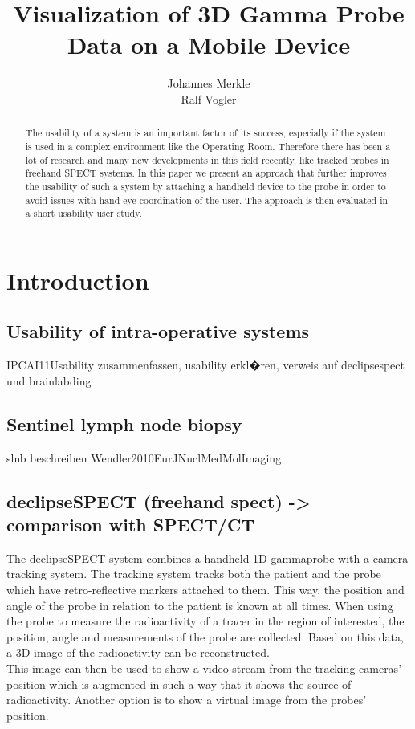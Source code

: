 \documentclass{scrartcl}
\title{Visualization of 3D Gamma Probe Data on a Mobile Device}
\author{Johannes Merkle \\ Ralf Vogler}
\begin{document}
\maketitle

\begin{abstract}
The usability of a system is an important factor of its success, especially if the system is used in a complex environment like the Operating Room. Therefore there has been a lot of research and many new developments in this field recently, like tracked probes in freehand SPECT systems. In this paper we present an approach that further improves the usability of such a system by attaching a handheld device to the probe in order to avoid issues with hand-eye coordination of the user. The approach is then evaluated in a short usability user study.
\end{abstract}


\section{Introduction}

\subsection{Usability of intra-operative systems}
IPCAI11Usability zusammenfassen, usability erkl�ren, verweis auf declipsespect und brainlabding

\subsection{Sentinel lymph node biopsy}
slnb beschreiben Wendler2010EurJNuclMedMolImaging

\subsection{declipseSPECT (freehand spect) -> comparison with SPECT/CT}
The declipseSPECT system combines a handheld 1D-gammaprobe with a camera tracking system. The tracking system tracks both the patient and the probe which have retro-reflective markers attached to them. This way, the position and angle of the probe in relation to the patient is known at all times. When using the probe to measure the radioactivity of a tracer in the region of interested, the position, angle and measurements of the probe are collected. Based on this data, a 3D image of the radioactivity can be reconstructed.\\
This image can then be used to show a video stream from the tracking cameras' position which is augmented in such a way that it shows the source of radioactivity. Another option is to show a virtual image from the probes' position.
\end{document}
